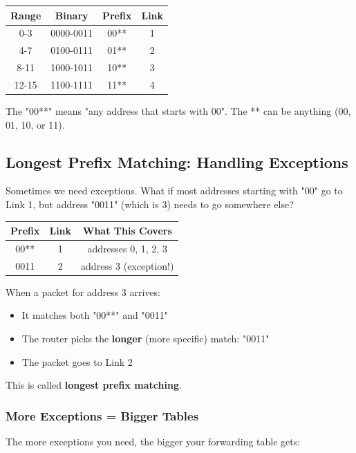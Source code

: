 \documentclass[../../compsys.tex]{subfiles}
\begin{document}
\begin{center}
\begin{tabular}{|c|c|c|c|}
\hline
\textbf{Range} & \textbf{Binary} & \textbf{Prefix} & \textbf{Link} \\
\hline
0-3 & 0000-0011 & 00** & 1 \\
4-7 & 0100-0111 & 01** & 2 \\
8-11 & 1000-1011 & 10** & 3 \\
12-15 & 1100-1111 & 11** & 4 \\
\hline
\end{tabular}
\end{center}

The "00**" means "any address that starts with 00". The ** can be anything (00, 01, 10, or 11).

\subsection{Longest Prefix Matching: Handling Exceptions}
Sometimes we need exceptions. What if most addresses starting with "00" go to Link 1, but address "0011" (which is 3) needs to go somewhere else?

\begin{center}
\begin{tabular}{|c|c|c|}
\hline
\textbf{Prefix} & \textbf{Link} & \textbf{What This Covers} \\
\hline
00** & 1 & addresses 0, 1, 2, 3 \\
0011 & 2 & address 3 (exception!) \\
\hline
\end{tabular}
\end{center}

When a packet for address 3 arrives:
\begin{itemize}
    \item It matches both "00**" and "0011"
    \item The router picks the \textbf{longer} (more specific) match: "0011"
    \item The packet goes to Link 2
\end{itemize}

This is called \textbf{longest prefix matching}.

\subsubsection{More Exceptions = Bigger Tables}
The more exceptions you need, the bigger your forwarding table gets:
\end{document}
